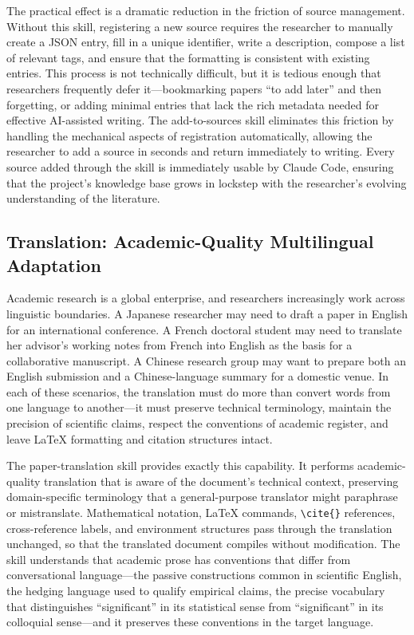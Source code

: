 \documentclass[a4paper,11pt]{article}
\begin{document}
The practical effect is a dramatic reduction in the friction of source management. Without this skill, registering a new source requires the researcher to manually create a JSON entry, fill in a unique identifier, write a description, compose a list of relevant tags, and ensure that the formatting is consistent with existing entries. This process is not technically difficult, but it is tedious enough that researchers frequently defer it---bookmarking papers ``to add later'' and then forgetting, or adding minimal entries that lack the rich metadata needed for effective AI-assisted writing. The add-to-sources skill eliminates this friction by handling the mechanical aspects of registration automatically, allowing the researcher to add a source in seconds and return immediately to writing. Every source added through the skill is immediately usable by Claude Code, ensuring that the project's knowledge base grows in lockstep with the researcher's evolving understanding of the literature.

\subsection{Translation: Academic-Quality Multilingual Adaptation}

Academic research is a global enterprise, and researchers increasingly work across linguistic boundaries. A Japanese researcher may need to draft a paper in English for an international conference. A French doctoral student may need to translate her advisor's working notes from French into English as the basis for a collaborative manuscript. A Chinese research group may want to prepare both an English submission and a Chinese-language summary for a domestic venue. In each of these scenarios, the translation must do more than convert words from one language to another---it must preserve technical terminology, maintain the precision of scientific claims, respect the conventions of academic register, and leave \LaTeX{} formatting and citation structures intact.

The paper-translation skill provides exactly this capability. It performs academic-quality translation that is aware of the document's technical context, preserving domain-specific terminology that a general-purpose translator might paraphrase or mistranslate. Mathematical notation, \LaTeX{} commands, \texttt{\textbackslash cite\{\}} references, cross-reference labels, and environment structures pass through the translation unchanged, so that the translated document compiles without modification. The skill understands that academic prose has conventions that differ from conversational language---the passive constructions common in scientific English, the hedging language used to qualify empirical claims, the precise vocabulary that distinguishes ``significant'' in its statistical sense from ``significant'' in its colloquial sense---and it preserves these conventions in the target language.
\end{document}
